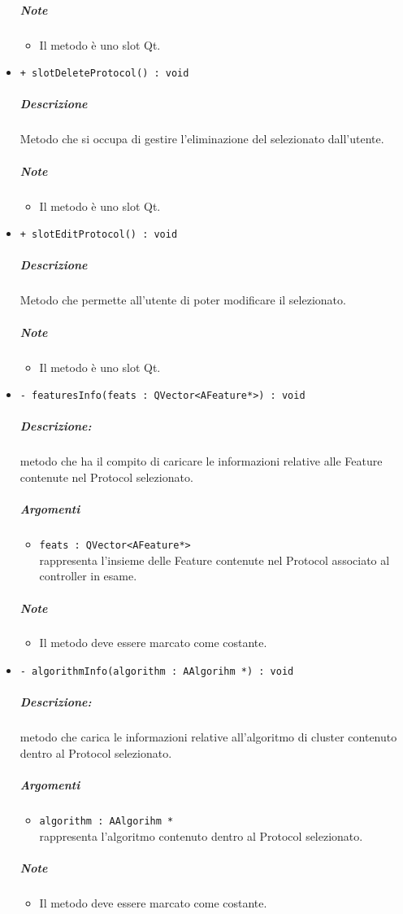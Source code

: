 \begin{itemize}
			\subparagraph{Note}
			\begin{itemize}
				\item Il metodo è uno slot\g{} Qt\g{}.
			\end{itemize}
			\item \color{blue} \verb!+ slotDeleteProtocol() : void!
			\color{black}
			\subparagraph{Descrizione} Metodo che si occupa di gestire l'eliminazione del \protocol{} selezionato dall'utente.
			\subparagraph{Note}
			\begin{itemize}
				\item Il metodo è uno slot\g{} Qt\g{}.
			\end{itemize}
			\item \color{blue} \verb!+ slotEditProtocol() : void!
			\color{black}
			\subparagraph{Descrizione} Metodo che permette all'utente di poter modificare il \protocol{} selezionato.
			\subparagraph{Note}
			\begin{itemize}
				\item Il metodo è uno slot\g{} Qt\g{}.
			\end{itemize}
			\item \color{blue} \verb!- featuresInfo(feats : QVector<AFeature*>) : void!
			\color{black}
			\subparagraph{Descrizione:} metodo che ha il compito di caricare le informazioni relative alle Feature\g{} contenute nel Protocol\g{} selezionato.
			\color{black}
			\subparagraph{Argomenti}
			\begin{itemize}
				\item \color{RoyalPurple} \verb!feats : QVector<AFeature*>!\\				
\color{black} rappresenta l'insieme delle Feature\g{}  contenute nel Protocol\g{} associato al controller in esame.
			\end{itemize}
			\subparagraph{Note}
			\begin{itemize}
				\item Il metodo deve essere marcato come costante.
			\end{itemize}
			\item \color{blue} \verb!- algorithmInfo(algorithm : AAlgorihm *) : void!
			\color{black}
			\subparagraph{Descrizione:} metodo che carica le informazioni relative all'algoritmo di cluster\g{} contenuto dentro al Protocol\g{} selezionato.
			\color{black}
			\subparagraph{Argomenti}
			\begin{itemize}
				\item \color{RoyalPurple} \verb!algorithm : AAlgorihm *!\\				
\color{black} rappresenta l'algoritmo contenuto dentro al Protocol\g{} selezionato.
			\end{itemize}
			\subparagraph{Note}
			\begin{itemize}
				\item Il metodo deve essere marcato come costante.
			\end{itemize}
		\end{itemize}
